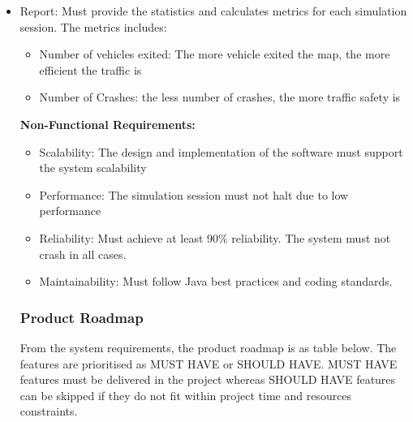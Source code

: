 \documentclass[11pt]{article}
\begin{document}
{\begin{itemize}
\begin{itemize}
\begin{itemize}
\begin{itemize}
\begin{itemize}
                \item LOW: 10\% possibility there is a new vehicle generated in each simulation step
                \end{itemize}
            \item Selected Map
            
            
            \end{itemize}
        
        \item Check the traffic context to make decision whether vehicles go straight, turn right, turn left, 3-point turn, increase speed, reduce speed or stop
        \end{itemize}
        
        
       
        \item Report: Must provide the statistics and calculates     metrics  for each simulation session. The metrics includes:
        \begin{itemize}
        \item Number of vehicles exited: The more vehicle exited the map, the more efficient the traffic is 
        \item Number of Crashes: the less number of crashes, the more traffic safety is
        
        \end{itemize}
        

    
    {\bf{Non-Functional Requirements:}} 
    \begin{itemize}
    \item Scalability: The design and implementation of the software must support the system scalability
    
    \item Performance: The simulation session must not halt due to low performance
    
    \item Reliability: Must achieve at least 90\% reliability. The system must not crash in all cases.
    
    \item Maintainability: Must follow Java best practices and coding standards. 
    
    \end{itemize}
   
      \subsubsection{Product Roadmap}
  From the system requirements, the product roadmap is as table below. The features are prioritised as MUST HAVE or SHOULD HAVE. MUST HAVE features must be delivered in the project whereas SHOULD HAVE features can be skipped if they do not fit within project time and resources  constraints.
  

\end{itemize}
\end{itemize}}
\end{document}
